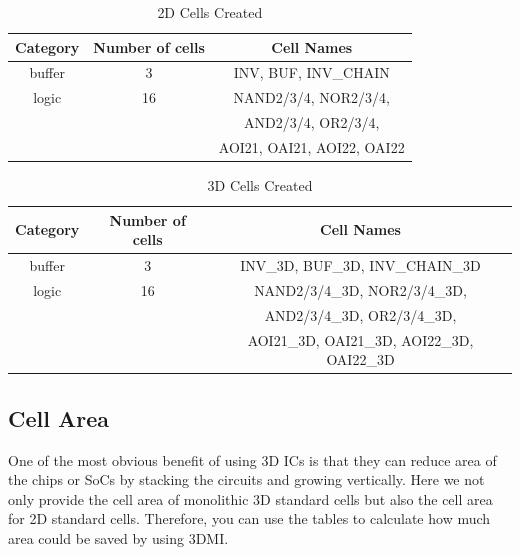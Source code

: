 \documentclass{article}
\begin{document}
\begin{table}
\centering
\begin{tabular}{|c|c|c|} 
\hline
Category&Number of cells&Cell Names \\ \hline
buffer&3&INV, BUF, INV\_CHAIN \\ \hline
logic&16&NAND2/3/4, NOR2/3/4,  \\ \hline
      &&  AND2/3/4, OR2/3/4, \\ \hline  
    &&AOI21, OAI21, AOI22, OAI22 \\ \hline
\end{tabular}
\label{tab:2d_cell_list}
\caption{2D Cells Created}
\end{table}

\begin{table}
\centering
\begin{tabular}{|c|c|c|} 
\hline
Category&Number of cells&Cell Names \\ \hline
buffer&3&INV\_3D, BUF\_3D, INV\_CHAIN\_3D \\ \hline
logic&16&NAND2/3/4\_3D, NOR2/3/4\_3D, \\ \hline
        &&AND2/3/4\_3D, OR2/3/4\_3D,  \\ \hline
    &&AOI21\_3D, OAI21\_3D, AOI22\_3D, OAI22\_3D \\ \hline
\end{tabular}
\label{tab:3d_cell_list}
\caption{3D Cells Created}
\end{table}


\subsection{Cell Area}
  One of the most obvious benefit of using 3D ICs is that they can reduce area of the chips or SoCs by stacking the circuits and growing vertically. Here we not only provide the cell area of monolithic 3D standard cells but also  the cell area for 2D standard cells. Therefore, you can use the tables to calculate how much area could be saved by using 3DMI.
\end{document}
